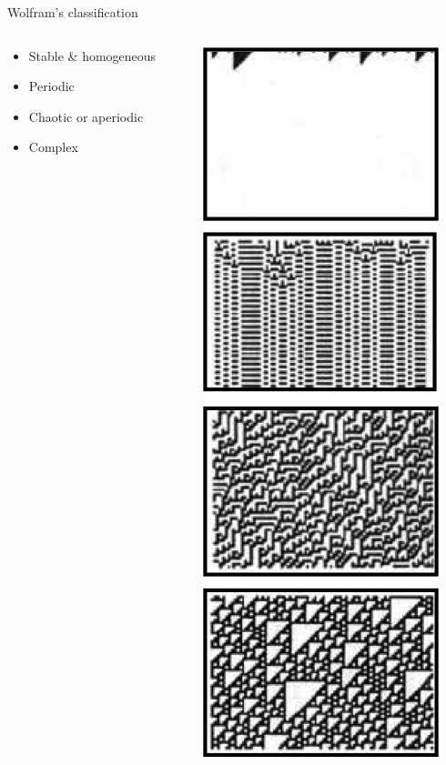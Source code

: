 \documentclass{eecslides}
\begin{document}
	\begin{frame}{Wolfram's classification}

		\begin{columns}
			\begin{column}{0.5\textwidth}
				\begin{itemize}
					\item Stable \& homogeneous
					\item Periodic
					\item Chaotic or aperiodic
					\item Complex
				\end{itemize}
			\end{column}
			\begin{column}{0.5\textwidth}
				\begin{center}
					\includegraphics[height=0.6\textheight]{ca_types}
				\end{center}
			\end{column}
		\end{columns}	 

	\end{frame}
\end{document}
